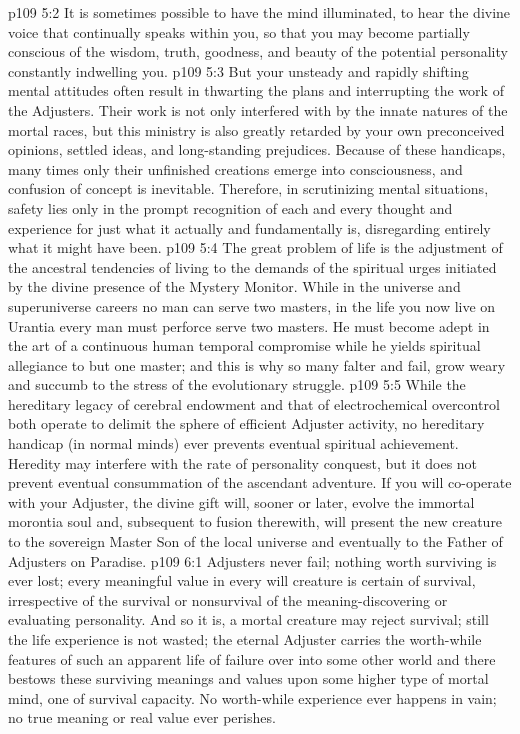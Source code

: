 \vs p109 5:2 It is sometimes possible to have the mind illuminated, to hear the divine voice that continually speaks within you, so that you may become partially conscious of the wisdom, truth, goodness, and beauty of the potential personality constantly indwelling you.
\vs p109 5:3 But your unsteady and rapidly shifting mental attitudes often result in thwarting the plans and interrupting the work of the Adjusters. Their work is not only interfered with by the innate natures of the mortal races, but this ministry is also greatly retarded by your own preconceived opinions, settled ideas, and long\hyp{}standing prejudices. Because of these handicaps, many times only their unfinished creations emerge into consciousness, and confusion of concept is inevitable. Therefore, in scrutinizing mental situations, safety lies only in the prompt recognition of each and every thought and experience for just what it actually and fundamentally is, disregarding entirely what it might have been.
\vs p109 5:4 \pc The great problem of life is the adjustment of the ancestral tendencies of living to the demands of the spiritual urges initiated by the divine presence of the Mystery Monitor. While in the universe and superuniverse careers no man can serve two masters, in the life you now live on Urantia every man must perforce serve two masters. He must become adept in the art of a continuous human temporal compromise while he yields spiritual allegiance to but one master; and this is why so many falter and fail, grow weary and succumb to the stress of the evolutionary struggle.
\vs p109 5:5 While the hereditary legacy of cerebral endowment and that of electrochemical overcontrol both operate to delimit the sphere of efficient Adjuster activity, no hereditary handicap (in normal minds) ever prevents eventual spiritual achievement. Heredity may interfere with the rate of personality conquest, but it does not prevent eventual consummation of the ascendant adventure. If you will co\hyp{}operate with your Adjuster, the divine gift will, sooner or later, evolve the immortal morontia soul and, subsequent to fusion therewith, will present the new creature to the sovereign Master Son of the local universe and eventually to the Father of Adjusters on Paradise.
\vs p109 6:1 Adjusters never fail; nothing worth surviving is ever lost; every meaningful value in every will creature is certain of survival, irrespective of the survival or nonsurvival of the meaning\hyp{}discovering or evaluating personality. And so it is, a mortal creature may reject survival; still the life experience is not wasted; the eternal Adjuster carries the worth\hyp{}while features of such an apparent life of failure over into some other world and there bestows these surviving meanings and values upon some higher type of mortal mind, one of survival capacity. No worth\hyp{}while experience ever happens in vain; no true meaning or real value ever perishes.
